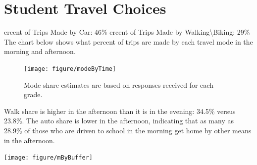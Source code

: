 \documentclass[12pt,letterpaper]{report}\usepackage{graphicx, color}
\newenvironment{knitrout}{}{} %
\newcommand{\factoid}[1]{\flushleft{\large{#1}}}
\begin{document}
\newpage
\section*{Student Travel Choices}
{\factoid Percent of Trips Made by Car: 46\%}
{\factoid Percent of Trips Made by Walking\textbackslash Biking: 29\%}
\newline
{\flushleft The chart below shows what percent of trips are made by each travel mode in the morning and afternoon.}

\begin{knitrout}
\color{fgcolor}\begin{figure}[H]


{\centering \texttt{[image: figure/modeByTime]} 

}

\caption[Mode share estimates are based on responses received for each grade]{Mode share estimates are based on responses received for each grade.\label{fig:modeByTime}}
\end{figure}


\end{knitrout}


Walk share is higher in the afternoon than it is in the evening: 
34.5\% versus 23.8\%. The auto share is lower in the afternoon, indicating that as many as 28.9\% of those who are driven to school in the morning get home by other means in the afternoon.


\begin{knitrout}
\color{fgcolor}

{\centering \texttt{[image: figure/mByBuffer]} 

}



\end{knitrout}
\end{document}
